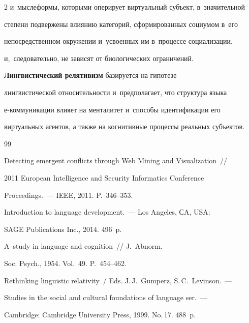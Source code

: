 \begin{multicols}{2}
и~мыс\-ле\-фор\-мы, которыми оперирует виртуальный субъект, в~значительной 

степени подвержены влиянию категорий, сформированных социумом в~его 

непосредственном окружении и~усвоенных им в~процессе социализации, 

и,~следовательно, не зависят от биологических ограничений.

  

  \textbf{Лингвистический релятивизм} базируется на гипотезе 

лингвистической относительности и~предполагает, что структура языка  

е-ком\-му\-ни\-ка\-ции влияет на менталитет и~способы идентификации его 

виртуальных агентов, а также на когнитивные процессы реальных субъектов.

  

{\small\frenchspacing

 {%


 \begin{thebibliography}{99}


 Detecting emergent conflicts through Web Mining and Visualization~// 

2011 European Intelligence and Security Informatics Conference 

Proceedings.~--- IEEE, 2011. P.~346--353.


 Introduction to language development.~--- Los Angeles, СA, USA: 

SAGE Publications Inc., 2014. 496~p.


 A~study in language and cognition~// J.~Abnorm. 

Soc. Psych., 1954. Vol.~49. P.~454--462.


Rethinking linguistic relativity~/ Eds. J.\,J.~Gumperz, S.\,C.~Levinson.~--- 

Studies in the social and cultural foundations of language ser.~--- 

Cambridge: Cambridge University Press, 1999.  No.\,17. 488~p. 


\end{thebibliography}}}
\end{multicols}

